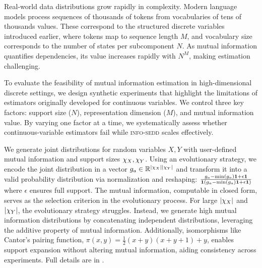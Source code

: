 Real-world data distributions grow rapidly in complexity. Modern language models \citep{radford2019language,lou2024discrete} process sequences of thousands of tokens from vocabularies of tens of thousands values. These correspond to the structured discrete variables introduced earlier, where tokens map to sequence length $M$, and vocabulary size corresponds to the number of states per subcomponent $N$. As mutual information quantifies dependencies, its value increases rapidly with $N^M$, making estimation challenging.

To evaluate the feasibility of mutual information estimation in high-dimensional discrete settings, we design synthetic experiments that highlight the limitations of estimators originally developed for continuous variables. We control three key factors: support size ($N$), representation dimension ($M$), and mutual information value. By varying one factor at a time, we systematically assess whether continuous-variable estimators fail while \textsc{info-sedd} scales effectively.

We generate joint distributions for random variables $X, Y$ with user-defined mutual information and support sizes $\chi_X, \chi_Y$. Using an evolutionary strategy, we encode the joint distribution in a vector $g_a \in \mathbb{R}^{|\chi_X||\chi_Y|}$ and transform it into a valid probability distribution via normalization and reshaping: $\frac{g_a-\text{min}(g_a)\mathbf{1}+\epsilon\mathbf{1}}{\mathbf{1}(g_a-\text{min}(g_a)\mathbf{1}+\epsilon\mathbf{1})}$ where $\epsilon$ ensures full support. The mutual information, computable in closed form, serves as the selection criterion in the evolutionary process. For large $|\chi_X|$ and $|\chi_Y|$, the evolutionary strategy struggles. Instead, we generate high mutual information distributions by concatenating independent distributions, leveraging the additive property of mutual information. Additionally, isomorphisms like Cantor’s pairing function, $\pi(x,y) = \frac{1}{2}(x+y)(x+y+1)+y$, enables support expansion without altering mutual information, aiding consistency across experiments. Full details are in .